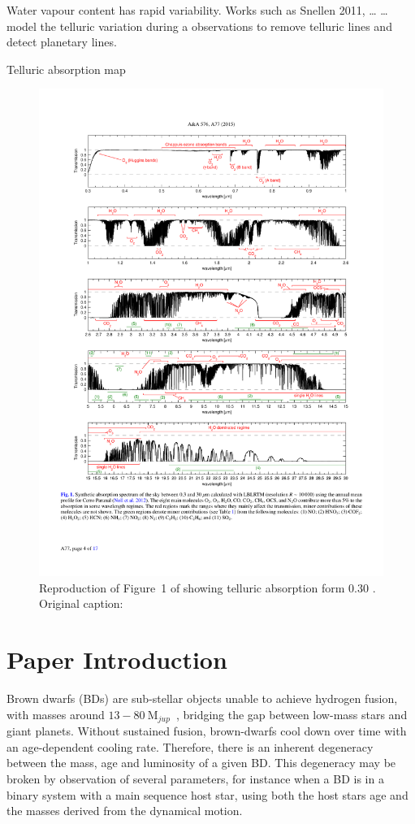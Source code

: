 Water vapour content has rapid variability. Works such as Snellen 2011, \ldots{} \ldots{}  model the telluric variation during a observations to remove telluric lines and detect planetary lines.



Telluric absorption map
\begin{figure}
    \centering
    \includegraphics[width=0.9\linewidth]{figures/advanced_material/cropped_molecfit_absorbtion}
    \caption{Reproduction of Figure~1 of \citet{smette_molecfit_2015} showing telluric absorption form 0.30 \um. Original caption:}
    \label{fig:croppedmolecfitabsorbtion}
\end{figure}




\section{Paper Introduction}
\label{sec:intro}
Brown dwarfs (BDs) are sub-stellar objects unable to achieve hydrogen fusion, with masses around \(13-80~\textrm{M}_{jup} \)~\citep{chabrier_theory_2000}, bridging the gap between low-mass stars and giant planets. Without sustained fusion, brown-dwarfs cool down over time with an age-dependent cooling rate. Therefore, there is an inherent degeneracy between the mass, age and luminosity of a given BD\citep{burrows_nongray_1997}. This degeneracy may be broken by observation of several parameters, for instance when a BD is in a binary system with a main sequence host star, using both the host stars age and the masses derived from the dynamical motion.

